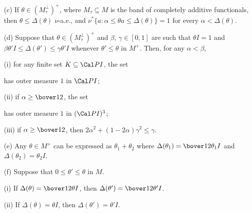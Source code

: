 (c) If $\theta\in(M_{\tau}^{\perp})^+$, where $M_{\tau}\subseteq M$ is
the band of completely additive functionals, then
$\theta\le\Delta(\theta)\,\,\nu$-a.e., and
$\nu^*\{a:\alpha\le\theta a\le\Delta(\theta)\}=1$ for every
$\alpha<\Delta(\theta)$.

(d) Suppose that $\theta\in(M_{\tau}^{\perp})^+$ and $\beta$,
$\gamma\in[0,1]$ are such that $\theta I=1$ and
$\beta\theta'I\le\Delta(\theta')\le\gamma\theta'I$ whenever
$\theta'\le\theta$ in $M^+$.   Then, for any $\alpha<\beta$,

\quad(i) for any finite set $K\subseteq\Cal PI$, the set


\noindent has outer measure $1$ in $\Cal PI$;

\quad(ii) if $\alpha\ge\bover12$, the set


\noindent has outer measure $1$ in $(\Cal PI)^3$;

\quad(iii) if $\alpha\ge\bover12$, then
$2\alpha^2+(1-2\alpha)\gamma^2\le\gamma$.

(e) Any $\theta\in M^+$ can be expressed as $\theta_1+\theta_2$ where
$\Delta(\theta_1)=\bover12\theta_1I$ and $\Delta(\theta_2)=\theta_2I$.

(f) Suppose that $0\le\theta'\le\theta$ in $M$.

\quad(i) If $\Delta(\theta)=\bover12\theta I$, then
$\Delta(\theta')=\bover12\theta'I$.

\quad(ii) If $\Delta(\theta)=\theta I$, then $\Delta(\theta')=\theta'I$.

